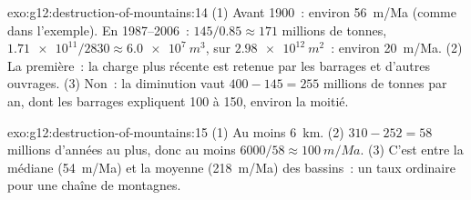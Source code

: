 \begin{solution}{exo:g12:destruction-of-mountains:14}
(1) Avant 1900~: environ \qty{56}{m/Ma} (comme dans l'exemple). En
1987--2006~: $145/0.85 \approx 171$ millions de tonnes, $\num{1.71e11}/2830
\approx \qty{6.0e7}{m^3}$, sur $\qty{2.98e12}{m^2}$~: environ
\qty{20}{m/Ma}. (2) La première~: la charge plus récente est retenue par
les barrages et d'autres ouvrages. (3) Non~: la diminution vaut
$400 - 145 = 255$ millions de tonnes par an, dont les barrages expliquent
100 à 150, environ la moitié.
\end{solution}

\begin{solution}{exo:g12:destruction-of-mountains:15}
(1) Au moins \qty{6}{km}. (2) $310 - 252 = 58$ millions d'années au plus,
donc au moins $6000/58 \approx \qty{100}{m/Ma}$. (3) C'est entre la
médiane (\qty{54}{m/Ma}) et la moyenne (\qty{218}{m/Ma}) des bassins~: un
taux ordinaire pour une chaîne de montagnes.
\end{solution}

